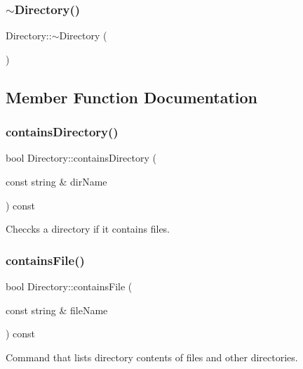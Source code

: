 \subsubsection{\texorpdfstring{$\sim$\+Directory()}{~Directory()}}
{\footnotesize\ttfamily Directory\+::$\sim$\+Directory (\begin{DoxyParamCaption}{ }\end{DoxyParamCaption})\hspace{0.3cm}{\ttfamily [inline]}}



\subsection{Member Function Documentation}
\mbox{\label{class_directory_ae84d7cdbbea5138b808dca098c28c820}} 
\subsubsection{\texorpdfstring{contains\+Directory()}{containsDirectory()}}
{\footnotesize\ttfamily bool Directory\+::contains\+Directory (\begin{DoxyParamCaption}\item[{const string \&}]{dir\+Name }\end{DoxyParamCaption}) const}



Checcks a directory if it contains files. 

\mbox{\label{class_directory_a0286ef72f0d7cd5a0be7c15c0db46942}} 
\subsubsection{\texorpdfstring{contains\+File()}{containsFile()}}
{\footnotesize\ttfamily bool Directory\+::contains\+File (\begin{DoxyParamCaption}\item[{const string \&}]{file\+Name }\end{DoxyParamCaption}) const}



Command that lists directory contents of files and other directories. 

